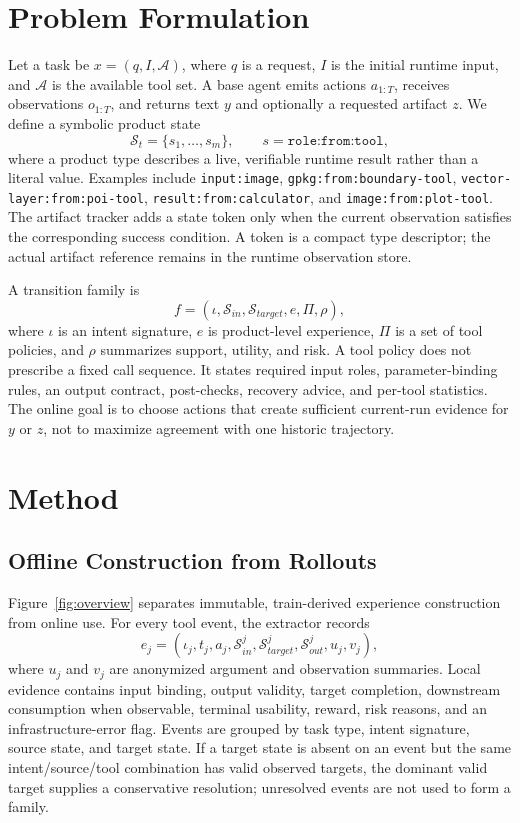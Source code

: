 \documentclass[10pt]{article}
\newcommand{\state}{\mathcal{S}}
\begin{document}
\section{Problem Formulation}
Let a task be $x=(q,I,\mathcal{A})$, where $q$ is a request, $I$ is the initial runtime input, and $\mathcal{A}$ is the available tool set. A base agent emits actions $a_{1:T}$, receives observations $o_{1:T}$, and returns text $y$ and optionally a requested artifact $z$. We define a symbolic product state
\begin{equation}
\state_t=\{s_1,\ldots,s_m\}, \qquad s=\texttt{role:from:tool},
\end{equation}
where a product type describes a live, verifiable runtime result rather than a literal value. Examples include \texttt{input:image}, \texttt{gpkg:from:boundary-tool}, \texttt{vector-layer:from:poi-tool}, \texttt{result:from:calculator}, and \texttt{image:from:plot-tool}. The artifact tracker adds a state token only when the current observation satisfies the corresponding success condition. A token is a compact type descriptor; the actual artifact reference remains in the runtime observation store.

A transition family is
\begin{equation}
f=(\iota,\state_{in},\state_{target},e,\Pi,\rho),
\label{eq:family}
\end{equation}
where $\iota$ is an intent signature, $e$ is product-level experience, $\Pi$ is a set of tool policies, and $\rho$ summarizes support, utility, and risk. A tool policy does not prescribe a fixed call sequence. It states required input roles, parameter-binding rules, an output contract, post-checks, recovery advice, and per-tool statistics. The online goal is to choose actions that create sufficient current-run evidence for $y$ or $z$, not to maximize agreement with one historic trajectory.

\section{Method}
\subsection{Offline Construction from Rollouts}
Figure~\ref{fig:overview} separates immutable, train-derived experience construction from online use. For every tool event, the extractor records
\begin{equation}
e_j=(\iota_j,t_j,a_j,\state^{j}_{in},\state^{j}_{target},\state^{j}_{out},u_j,v_j),
\end{equation}
where $u_j$ and $v_j$ are anonymized argument and observation summaries. Local evidence contains input binding, output validity, target completion, downstream consumption when observable, terminal usability, reward, risk reasons, and an infrastructure-error flag. Events are grouped by task type, intent signature, source state, and target state. If a target state is absent on an event but the same intent/source/tool combination has valid observed targets, the dominant valid target supplies a conservative resolution; unresolved events are not used to form a family.
\end{document}
